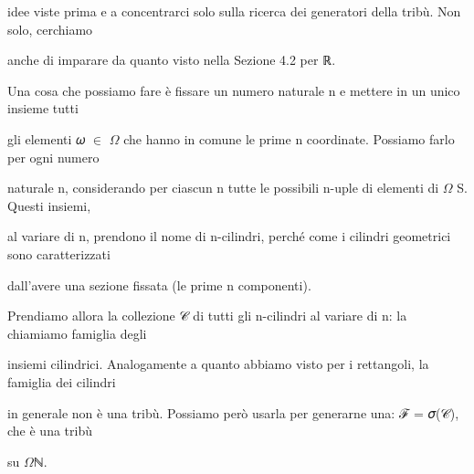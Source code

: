 \documentclass[a4paper,portrait,12pt]{article}
\begin{document}
\begin{flushleft}
idee viste prima e a concentrarci solo sulla ricerca dei generatori della tribù. Non solo, cerchiamo
\end{flushleft}


\begin{flushleft}
anche di imparare da quanto visto nella Sezione 4.2 per ℝ.
\end{flushleft}


\begin{flushleft}
Una cosa che possiamo fare \`{e} fissare un numero naturale n e mettere in un unico insieme tutti
\end{flushleft}


\begin{flushleft}
gli elementi 𝜔 $\in$ $\Omega$ che hanno in comune le prime n coordinate. Possiamo farlo per ogni numero
\end{flushleft}


\begin{flushleft}
naturale n, considerando per ciascun n tutte le possibili n-uple di elementi di $\Omega$ S. Questi insiemi,
\end{flushleft}


\begin{flushleft}
al variare di n, prendono il nome di n-cilindri, perch\'{e} come i cilindri geometrici sono caratterizzati
\end{flushleft}


\begin{flushleft}
dall'avere una sezione fissata (le prime n componenti).
\end{flushleft}


\begin{flushleft}
Prendiamo allora la collezione 𝒞 di tutti gli n-cilindri al variare di n: la chiamiamo famiglia degli
\end{flushleft}


\begin{flushleft}
insiemi cilindrici. Analogamente a quanto abbiamo visto per i rettangoli, la famiglia dei cilindri
\end{flushleft}


\begin{flushleft}
in generale non \`{e} una tribù. Possiamo per\`{o} usarla per generarne una: ℱ = 𝜎(𝒞), che \`{e} una tribù
\end{flushleft}


\begin{flushleft}
su $\Omega$ℕ.
\end{flushleft}
\end{document}
